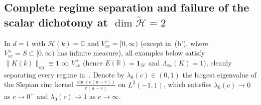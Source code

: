 \documentclass[11pt,a4paper]{article}
\theoremstyle{definition}
\theoremstyle{remark}
\newcommand{\HH}{\mathcal{H}}
\newcommand{\tH}{\widetilde{\mathcal{H}}}
\newcommand{\RR}{\mathbb{R}}
\newcommand{\CC}{\mathbb{C}}
\newcommand{\op}{\mathrm{op}}
\newcommand{\ac}{\mathrm{ac}}
\newcommand{\one}{\mathbf{1}}
\newcommand{\norm}[1]{\|#1\|}
\begin{document}
\subsection{Complete regime separation and failure of the scalar dichotomy at $\dim\tH=2$}

In $d=1$ with $\HH(k)=\CC$ and $V_\ac^+=[0,\infty)$ (except in~\textup{(b')}, where $V_\ac^+=S\subset[0,\infty)$ has infinite measure), all examples below satisfy $\norm{K(k)}_{\op}\equiv 1$ on $V_\ac^+$ (hence $E(\RR)=\one_\HH$ and $\Lambda_\infty(K)=1$), cleanly separating every regime in~\cite[Rem.~2.10]{FewsterLoveridge2026}. Denote by $\lambda_0(c)\in(0,1)$ the largest eigenvalue of the Slepian sinc kernel $\frac{\sin(c(u-v))}{\pi(u-v)}$ on $L^2(-1,1)$, which satisfies $\lambda_0(c)\to 0$ as $c\to 0^+$ and $\lambda_0(c)\to 1$ as $c\to\infty$.
\end{document}
